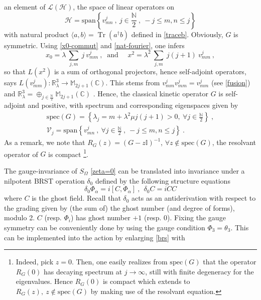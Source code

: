 \documentclass[a4paper,11pt,twoside]{article}
\numberwithin{equation}{section}
\newcommand\bbone{{ \mathbb{I}}}
\DeclareMathOperator{\tr}{Tr}
\theoremstyle{nonumberplain}
\newcounter{and}
\begin{document}
%
an element of $\mathcal{L}(\mathcal{H})$, the space of linear operators on 
\begin{equation*}
\mathcal{H}=\text{span}\left\{v^j_{mn} \ , \ j\in\frac{\mathbb{N}}{2} \ , \ -j\le m,n\le j\right\} 
\end{equation*}
%
with natural product $\langle a,b \rangle = \tr(a^\dag b)$ defined in \eqref{traceb}. Obviously, $G$ is symmetric. Using \eqref{x0-commut} and \eqref{nat-fourier}, one infers%
%
\begin{equation}
x_0 = \lambda \ \sum_{j,m} \ j \ v^j_{mm} \ , \ \mbox{ and } \quad x^2 = \lambda^2 \ \sum_{j,m} \ j(j+1) \ v^j_{mm} \ ,
\end{equation}
%
so that $L(x^2)$ is a sum of orthogonal projectors, hence self-adjoint operators, says $L(v^j_{mm}):\mathbb{R}^3_\lambda\to\mathbb{M}_{2j+1}(\mathbb{C})$. This stems from $v^j_{mm}v^j_{mm}=v^j_{mm}$ (see \eqref{fusion}) and $\mathbb{R}^3_\lambda=\oplus_{j\in\frac{\mathbb{N}}{2}}\mathbb{M}_{2j+1}(\mathbb{C})$ \cite{vit-wal-12}. Hence, the classical kinetic operator $G$ is self-adjoint and positive, with spectrum and corresponding eigenspaces given by%
%
\begin{eqnarray}
&\text{spec}(G)=\left\{ \lambda_j = m + \lambda^2 \mu j(j+1) >0 , \ \forall j \in \frac{\mathbb{N}}{2} \right\} \ , \label{spect-G}& \\
&\mathcal{V}_{j} = \text{span}\left\{ v^j_{mn} \ , \ \forall  j \in \frac{\mathbb{N}}{2} \ , \ -j\le m,n\le j \right\} \ . \label{eigensp-G}&
\end{eqnarray}
%
As a remark, we note that $R_G(z)=(G-z\bbone)^{-1}$, $\forall z\notin\text{spec}(G)$, the resolvant operator of $G$ is compact {\footnote{Indeed, pick $z=0$. Then, one easily realizes from $\text{spec}(G)$ that the operator $R_G(0)$ has decaying spectrum at $j\to\infty$, still with finite degeneracy for the eigenvalues. Hence $R_G(0)$ is compact which extends to $R_G(z),\ z\notin\text{spec}(G)$ by making use of the resolvant equation.}}.\par%
%
The gauge-invariance of $S_\Omega$ \eqref{zeta=0} can be translated into invariance under a nilpotent BRST operation $\delta_0$ defined by the following structure equations \cite{MVW13}%
%
\begin{equation}
\delta_0 \Phi_\alpha = i \left[C,\Phi_\alpha\right] \ , \ \ \delta_0C=iCC\label{brs}
\end{equation}
%
where $C$ is the ghost field. Recall that $\delta_0$ acts as an antiderivation with respect to the grading given by (the sum of) the ghost number (and degree of forms), modulo 2. $C$ (resp. $\Phi_i$) has ghost number $+1$ (resp. $0$). Fixing the gauge symmetry can be conveniently done by using the gauge condition $\Phi_3=\theta_3$. This can be implemented into the action by enlarging \eqref{brs} with%
\end{document}
